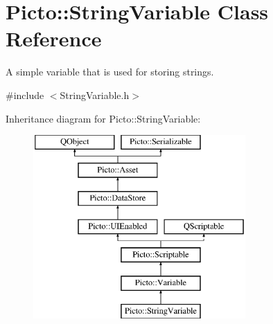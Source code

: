 \hypertarget{class_picto_1_1_string_variable}{\section{Picto\-:\-:String\-Variable Class Reference}
\label{class_picto_1_1_string_variable}
}


A simple variable that is used for storing strings.  




{\ttfamily \#include $<$String\-Variable.\-h$>$}

Inheritance diagram for Picto\-:\-:String\-Variable\-:\begin{figure}[H]
\begin{center}
\leavevmode
\includegraphics[height=7.000000cm]{class_picto_1_1_string_variable}
\end{center}
\end{figure}
